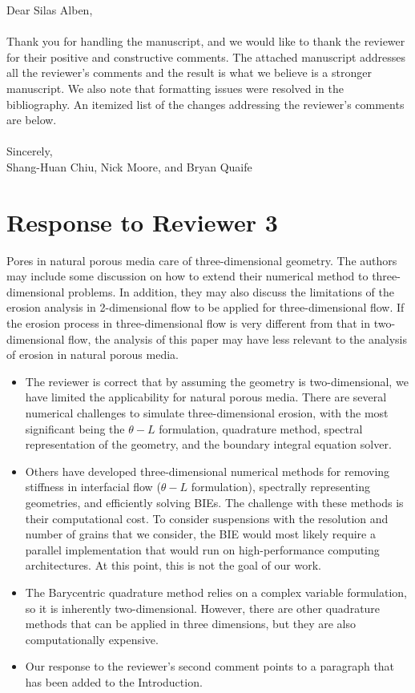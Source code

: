 \documentclass[11pt]{article}
\newcommand{\comment}[1]{{\color{blue} #1}}
\begin{document}
\noindent
Dear Silas Alben,
\\ \\
\noindent
Thank you for handling the manuscript, and we would like to thank the
reviewer for their positive and constructive comments.  The attached
manuscript addresses all the reviewer's comments and the result is what
we believe is a stronger manuscript.  We also note that formatting
issues were resolved in the bibliography. An itemized list of the
changes addressing the reviewer's comments are below.
\\ \\
\noindent
Sincerely,
\\
\noindent
Shang-Huan Chiu, Nick Moore, and Bryan Quaife

\section*{Response to Reviewer 3}


\noindent
\comment{Pores in natural porous media care of three-dimensional
geometry.  The authors may include some discussion on how to extend
their numerical method to three-dimensional problems.  In addition, they
may also discuss the limitations of the erosion analysis in
2-dimensional flow to be applied for three-dimensional flow. If the
erosion process in three-dimensional flow is very different from that in
two-dimensional flow, the analysis of this paper may have less relevant
to the analysis of erosion in natural porous media.}
\begin{itemize}
  \item The reviewer is correct that by assuming the geometry is
    two-dimensional, we have limited the applicability for natural
    porous media. There are several numerical challenges to simulate
    three-dimensional erosion, with the most significant being the
    $\theta-L$ formulation, quadrature method, spectral representation
    of the geometry, and the boundary integral equation solver.

  \item Others have developed three-dimensional numerical methods for
    removing stiffness in interfacial flow ($\theta-L$ formulation),
    spectrally representing geometries, and efficiently solving BIEs.
    The challenge with these methods is their computational cost. To
    consider suspensions with the resolution and number of grains that
    we consider, the BIE would most likely require a parallel
    implementation that would run on high-performance computing
    architectures. At this point, this is not the goal of our work.

  \item The Barycentric quadrature method relies on a complex variable
    formulation, so it is inherently two-dimensional. However, there are
    other quadrature methods that can be applied in three dimensions,
    but they are also computationally expensive.

  \item Our response to the reviewer's second comment points to a
    paragraph that has been added to the Introduction.


\end{itemize}
\end{document}
